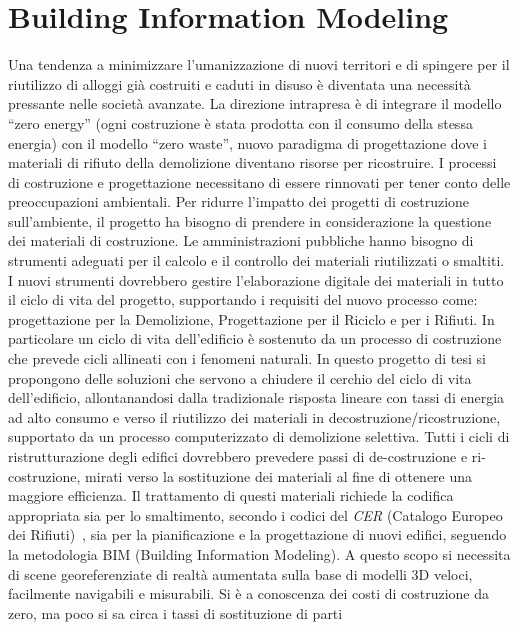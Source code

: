 \section{Building Information Modeling}
\label{sec:chapter_1_section_1}
\noindent

Una tendenza a minimizzare l'umanizzazione di nuovi territori e di spingere per il riutilizzo di alloggi
già costruiti e caduti in disuso è diventata una necessità pressante nelle società avanzate.
La direzione intrapresa è di integrare il modello ``zero energy'' (ogni costruzione è stata prodotta con il
consumo della stessa energia) con il modello ``zero waste'', nuovo paradigma di progettazione dove i materiali di
rifiuto della demolizione diventano risorse per ricostruire\cite{altamura:12}.
I processi di costruzione e progettazione necessitano di essere rinnovati per tener conto delle preoccupazioni
ambientali. Per ridurre l'impatto dei progetti di costruzione sull'ambiente, il progetto ha bisogno di prendere in
considerazione la questione dei materiali di costruzione.
Le amministrazioni pubbliche hanno bisogno di strumenti adeguati per il calcolo e il controllo dei materiali
riutilizzati o smaltiti.
I nuovi strumenti dovrebbero gestire l'elaborazione digitale dei materiali in tutto il ciclo di vita del progetto,
supportando i requisiti del nuovo processo come: progettazione per la Demolizione, Progettazione per il Riciclo e per i Rifiuti.
In particolare un ciclo di vita dell'edificio è sostenuto da un processo di costruzione che prevede cicli allineati
con i fenomeni naturali.
In questo progetto di tesi si propongono delle  soluzioni che servono a chiudere il cerchio del ciclo di vita dell'edificio,
allontanandosi dalla tradizionale risposta lineare con tassi di energia ad alto consumo e verso il riutilizzo
dei materiali in decostruzione/ricostruzione, supportato da un processo computerizzato di demolizione selettiva.
Tutti i cicli di ristrutturazione degli edifici dovrebbero prevedere passi di de-costruzione e ri-costruzione, mirati
verso la sostituzione dei materiali al fine di ottenere una maggiore efficienza. Il trattamento di questi materiali
richiede la codifica appropriata sia per lo smaltimento, secondo i codici del \emph{CER} (Catalogo Europeo dei Rifiuti)~\cite{cer},
sia per la pianificazione e la progettazione di nuovi edifici, seguendo la metodologia BIM (Building Information Modeling).
A questo scopo si necessita di scene georeferenziate di realtà aumentata sulla base di modelli 3D veloci,
facilmente navigabili e misurabili.
Si è a conoscenza dei costi di costruzione da zero, ma poco si sa circa i tassi di sostituzione di parti
